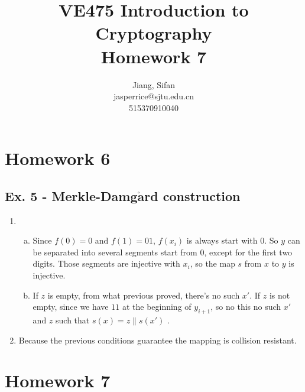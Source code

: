 \documentclass[11pt,a4paper]{article}
\title{
	VE475 Introduction to Cryptography \\
	Homework 7
}
\author{
	Jiang, Sifan\\
	jasperrice@sjtu.edu.cn\\
	515370910040
}
\begin{document}
\maketitle
\section*{Homework 6}
\subsection*{Ex. 5 - Merkle-Damg$\mathrm{\mathbf{\mathring{a}}}$rd construction}
\begin{enumerate}
\item \begin{enumerate}[a)]
\item Since $f(0)=0$ and $f(1)=01$, $f(x_{i})$ is always start with $0$. So $y$ can be separated into several segments start from $0$, except for the first two digits. Those segments are injective with $x_{i}$, so the map $s$ from $x$ to $y$ is injective.

\item If $z$ is empty, from what previous proved, there's no such $x'$. If $z$ is not empty, since we have $11$ at the beginning of $y_{i+1}$, so no this no such $x'$ and $z$ such that $s(x) = z \| s(x')$ .
\end{enumerate}

\item Because the previous conditions guarantee the mapping is collision resistant.
\end{enumerate}



\section*{Homework 7}
\end{document}
